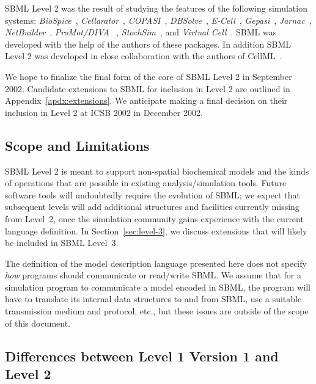 \documentclass[10pt]{cekarticle}
\begin{document}
SBML Level 2 was the result of studying the features of the
following simulation systems: \emph{BioSpice}~\citep{arkin:2001},
\emph{Cellarator}~\citep{shapiro:2000},
\emph{COPASI}~\citep{mendes:2000},
\emph{DBSolve}~\citep{goryanin:2001,goryanin:1999},
\emph{E-Cell}~\citep{tomita:1999,tomita:2001},
\emph{Gepasi}~\citep{mendes:1997,mendes:2001},
\emph{Jarnac}~\citep{sauro:2000,sauro:1991},
\emph{NetBuilder}~\citep{schilstra:2002},
\emph{ProMot/DIVA} ~\citep{trankle:1997},
 \emph{StochSim}~\citep{bray:2001,morton-firth:1998},
and \emph{Virtual Cell}~\citep{schaff:2000,schaff:2001}. SBML was
developed with the help of the authors of these packages.  In addition SBML Level 2 was developed in close collaboration with the authors of CellML~\citep{Physiome:2001}.

We hope to finalize the final form of the core of SBML Level 2 in September 2002. Candidate extensions to SBML for inclusion in Level 2 are outlined in Appendix~\ref{apdx:extensions}.  We anticipate making a final decision on their inclusion in Level 2 at ICSB 2002 in December 2002.
\subsection{Scope and Limitations}

SBML Level 2 is meant to support non-spatial biochemical models
and the kinds of operations that are possible in existing
analysis/simulation tools.  Future software tools will undoubtedly require the
evolution of SBML; we expect that subsequent levels will add
additional structures and facilities currently missing from
Level~2, once the simulation community gains experience with the
current language definition. In Section~\ref{sec:level-3}, we
discuss extensions that will likely be included in SBML Level~3.

The definition of the model description language presented here does not
specify \emph{how} programs should communicate or read/write SBML.  We
assume that for a simulation program to communicate a model encoded in
SBML, the program will have to translate its internal data structures to
and from SBML, use a suitable transmission medium and protocol, etc., but
these issues are outside of the scope of this document.

\subsection{Differences between Level 1 Version 1 and Level 2}
\end{document}
